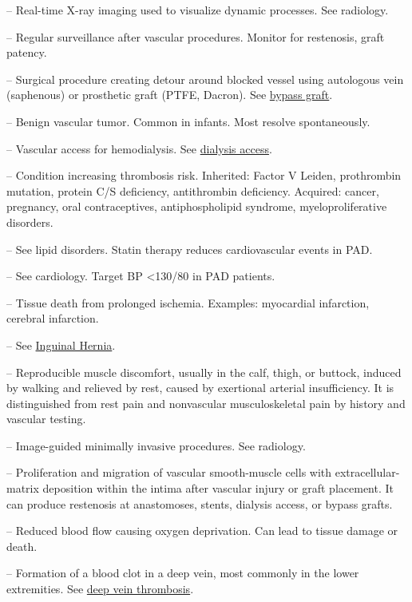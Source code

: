 -- Real-time X-ray imaging used to visualize dynamic processes. See radiology.

-- Regular surveillance after vascular procedures. Monitor for restenosis, graft patency.

-- Surgical procedure creating detour around blocked vessel using autologous vein (saphenous) or prosthetic graft (PTFE, Dacron). See \hyperlink{Bypass Graft}{bypass graft}.

-- Benign vascular tumor. Common in infants. Most resolve spontaneously.

-- Vascular access for hemodialysis. See \hyperlink{Dialysis Access}{dialysis access}.

-- Condition increasing thrombosis risk. Inherited: Factor V Leiden, prothrombin mutation, protein C/S deficiency, antithrombin deficiency. Acquired: cancer, pregnancy, oral contraceptives, antiphospholipid syndrome, myeloproliferative disorders.

-- See lipid disorders. Statin therapy reduces cardiovascular events in PAD.

-- See cardiology. Target BP <130/80 in PAD patients.

-- Tissue death from prolonged ischemia. Examples: myocardial infarction, cerebral infarction.

-- See \hyperlink{Inguinal Hernia}{Inguinal Hernia}.

-- Reproducible muscle discomfort, usually in the calf, thigh, or buttock, induced by walking and relieved by rest, caused by exertional arterial insufficiency. It is distinguished from rest pain and nonvascular musculoskeletal pain by history and vascular testing.

-- Image-guided minimally invasive procedures. See radiology.

-- Proliferation and migration of vascular smooth-muscle cells with extracellular-matrix deposition within the intima after vascular injury or graft placement. It can produce restenosis at anastomoses, stents, dialysis access, or bypass grafts.

-- Reduced blood flow causing oxygen deprivation. Can lead to tissue damage or death.

-- Formation of a blood clot in a deep vein, most commonly in the lower extremities. See \hyperlink{Deep Vein Thrombosis}{deep vein thrombosis}.

